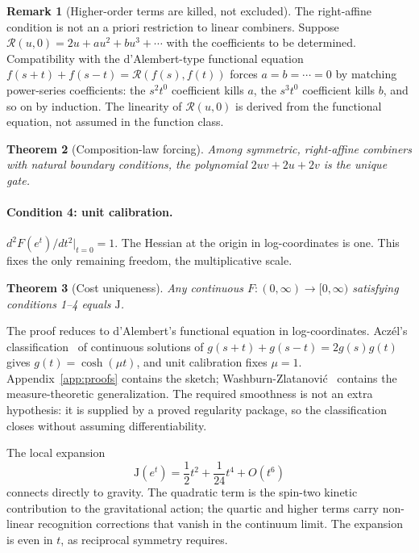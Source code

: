 \documentclass[11pt,letterpaper]{article}
\newtheorem{theorem}{Theorem}[section]
\theoremstyle{definition}
\newtheorem{remark}[theorem]{Remark}
\newcommand{\J}{\mathrm{J}}
\begin{document}
\begin{remark}[Higher-order terms are killed, not excluded]
\label{rem:right-affine}
The right-affine condition is not an a priori restriction to linear
combiners.  Suppose $\mathcal{R}(u,0)=2u+au^2+bu^3+\cdots$ with the
coefficients to be determined.  Compatibility with the d'Alembert-type
functional equation $f(s+t)+f(s-t)=\mathcal{R}(f(s),f(t))$ forces
$a=b=\cdots=0$ by matching power-series coefficients: the $s^2t^0$
coefficient kills $a$, the $s^3t^0$ coefficient kills $b$, and so on by
induction.  The linearity of $\mathcal{R}(u,0)$ is derived from the
functional equation, not assumed in the function class.
\end{remark}

\begin{theorem}[Composition-law forcing]\label{thm:rcl}
Among symmetric, right-affine combiners with natural boundary
conditions, the polynomial $2uv+2u+2v$ is the unique gate.
\end{theorem}

\paragraph{Condition 4: unit calibration.}
$d^2F(e^t)/dt^2|_{t=0}=1$.  The Hessian at the origin in
log-coordinates is one.  This fixes the only remaining freedom, the
multiplicative scale.

\begin{theorem}[Cost uniqueness]\label{thm:cost}
Any continuous $F:(0,\infty)\to[0,\infty)$ satisfying conditions 1--4
equals $\J$.
\end{theorem}

The proof reduces to d'Alembert's functional equation in
log-coordinates.  Acz\'el's classification~\cite{Aczel1966} of
continuous solutions of $g(s+t)+g(s-t)=2g(s)g(t)$ gives
$g(t)=\cosh(\mu t)$, and unit calibration fixes $\mu=1$.
Appendix~\ref{app:proofs} contains the sketch;
Washburn-Zlatanovi\'c~\cite{WashburnZlatanovic2026} contains the
measure-theoretic generalization.  The required smoothness is not an
extra hypothesis: it is supplied by a proved regularity package, so the
classification closes without assuming differentiability.

The local expansion
\begin{equation}\label{eq:expansion}
\J(e^t)=\frac{1}{2}t^2+\frac{1}{24}t^4+O(t^6)
\end{equation}
connects directly to gravity.  The quadratic term is the spin-two
kinetic contribution to the gravitational action; the quartic and
higher terms carry non-linear recognition corrections that vanish in
the continuum limit.  The expansion is even in $t$, as reciprocal
symmetry requires.
\end{document}
